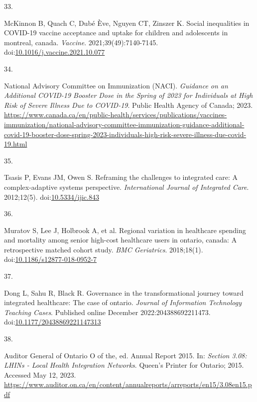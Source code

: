 \documentclass[
]{article}
\newlength{\cslhangindent}
\newlength{\csllabelwidth}
\newlength{\cslentryspacingunit} %
\newenvironment{CSLReferences}[2] %
 {%
  \setlength{\parindent}{0pt}
  \ifodd #1
  \let\oldpar\par
  \def\par{\hangindent=\cslhangindent\oldpar}
  \fi
  \setlength{\parskip}{#2\cslentryspacingunit}
 }%
 {}
\newcommand{\CSLLeftMargin}[1]{\parbox[t]{\csllabelwidth}{#1}}
\newcommand{\CSLRightInline}[1]{\parbox[t]{\linewidth - \csllabelwidth}{#1}\break}
\begin{document}
\begin{CSLReferences}{0}{0}
\leavevmode{}%
\CSLLeftMargin{33. }%
\CSLRightInline{McKinnon B, Quach C, Dubé Ève, Nguyen CT, Zinszer K.
Social inequalities in {COVID}-19 vaccine acceptance and uptake for
children and adolescents in montreal, canada. \emph{Vaccine}.
2021;39(49):7140-7145.
doi:\href{https://doi.org/10.1016/j.vaccine.2021.10.077}{10.1016/j.vaccine.2021.10.077}}

\leavevmode{}%
\CSLLeftMargin{34. }%
\CSLRightInline{National Advisory Committee on Immunization (NACI).
\emph{Guidance on an Additional COVID-19 Booster Dose in the Spring of
2023 for Individuals at High Risk of Severe Illness Due to COVID-19}.
Public Health Agency of Canada; 2023.
\url{https://www.canada.ca/en/public-health/services/publications/vaccines-immunization/national-advisory-committee-immunization-guidance-additional-covid-19-booster-dose-spring-2023-individuals-high-risk-severe-illness-due-covid-19.html}}

\leavevmode{}%
\CSLLeftMargin{35. }%
\CSLRightInline{Tsasis P, Evans JM, Owen S. Reframing the challenges to
integrated care: A complex-adaptive systems perspective.
\emph{International Journal of Integrated Care}. 2012;12(5).
doi:\href{https://doi.org/10.5334/ijic.843}{10.5334/ijic.843}}

\leavevmode{}%
\CSLLeftMargin{36. }%
\CSLRightInline{Muratov S, Lee J, Holbrook A, et al. Regional variation
in healthcare spending and mortality among senior high-cost healthcare
users in ontario, canada: A retrospective matched cohort study.
\emph{{BMC} Geriatrics}. 2018;18(1).
doi:\href{https://doi.org/10.1186/s12877-018-0952-7}{10.1186/s12877-018-0952-7}}

\leavevmode{}%
\CSLLeftMargin{37. }%
\CSLRightInline{Dong L, Sahu R, Black R. Governance in the
transformational journey toward integrated healthcare: The case of
ontario. \emph{Journal of Information Technology Teaching Cases}.
Published online December 2022:204388692211473.
doi:\href{https://doi.org/10.1177/20438869221147313}{10.1177/20438869221147313}}

\leavevmode{}%
\CSLLeftMargin{38. }%
\CSLRightInline{Auditor General of Ontario O of the, ed. Annual {R}eport
2015. In: \emph{Section 3.08: LHINs - Local Health Integration
Networks}. Queen's Printer for Ontario; 2015. Accessed May 12, 2023.
\url{https://www.auditor.on.ca/en/content/annualreports/arreports/en15/3.08en15.pdf}}


\end{CSLReferences}
\end{document}
